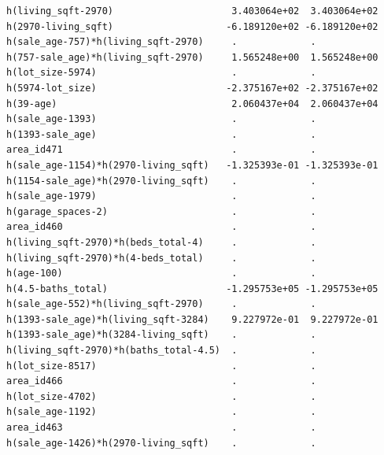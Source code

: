 \documentclass[
]{article}
\begin{document}
\begin{verbatim}
h(living_sqft-2970)                     3.403064e+02  3.403064e+02
h(2970-living_sqft)                    -6.189120e+02 -6.189120e+02
h(sale_age-757)*h(living_sqft-2970)     .             .           
h(757-sale_age)*h(living_sqft-2970)     1.565248e+00  1.565248e+00
h(lot_size-5974)                        .             .           
h(5974-lot_size)                       -2.375167e+02 -2.375167e+02
h(39-age)                               2.060437e+04  2.060437e+04
h(sale_age-1393)                        .             .           
h(1393-sale_age)                        .             .           
area_id471                              .             .           
h(sale_age-1154)*h(2970-living_sqft)   -1.325393e-01 -1.325393e-01
h(1154-sale_age)*h(2970-living_sqft)    .             .           
h(sale_age-1979)                        .             .           
h(garage_spaces-2)                      .             .           
area_id460                              .             .           
h(living_sqft-2970)*h(beds_total-4)     .             .           
h(living_sqft-2970)*h(4-beds_total)     .             .           
h(age-100)                              .             .           
h(4.5-baths_total)                     -1.295753e+05 -1.295753e+05
h(sale_age-552)*h(living_sqft-2970)     .             .           
h(1393-sale_age)*h(living_sqft-3284)    9.227972e-01  9.227972e-01
h(1393-sale_age)*h(3284-living_sqft)    .             .           
h(living_sqft-2970)*h(baths_total-4.5)  .             .           
h(lot_size-8517)                        .             .           
area_id466                              .             .           
h(lot_size-4702)                        .             .           
h(sale_age-1192)                        .             .           
area_id463                              .             .           
h(sale_age-1426)*h(2970-living_sqft)    .             .           
                                                                  

\end{verbatim}
\end{document}

